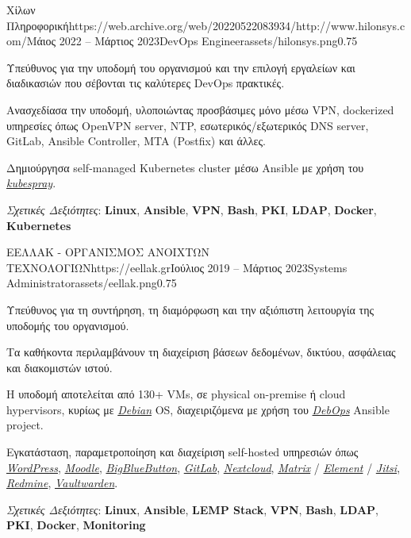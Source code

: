 \documentclass{mycv}
\begin{document}
	\begin{EntryDatedLogo}{Χίλων Πληροφορική}{https://web.archive.org/web/20220522083934/http://www.hilonsys.com/}{Μάιος 2022 -- Μάρτιος 2023}{DevOps Engineer}{assets/hilonsys.png}{0.75}
		\begin{Itemize}
			\item Υπεύθυνος για την υποδομή του οργανισμού και την επιλογή εργαλείων και διαδικασιών που σέβονται τις καλύτερες DevOps πρακτικές.
			\item Ανασχεδίασα την υποδομή, υλοποιώντας προσβάσιμες μόνο μέσω VPN, dockerized υπηρεσίες όπως OpenVPN server, NTP, εσωτερικός/εξωτερικός DNS server, GitLab, Ansible Controller, MTA (Postfix) και άλλες.
			\item Δημιούργησα self-managed Kubernetes cluster μέσω Ansible με χρήση του \href{https://kubespray.io/}{\textit{kubespray}}.
			\item \textit{Σχετικές Δεξιότητες}: \textbf{Linux}, \textbf{Ansible}, \textbf{VPN}, \textbf{Bash}, \textbf{PKI}, \textbf{LDAP}, \textbf{Docker}, \textbf{Kubernetes}
		\end{Itemize}
	\end{EntryDatedLogo}

	\vspace{0.5cm}

	\begin{EntryDatedLogo}{ΕΕΛΛΑΚ - ΟΡΓΑΝΙΣΜΟΣ ΑΝΟΙΧΤΩΝ ΤΕΧΝΟΛΟΓΙΩΝ}{https://eellak.gr}{Ιούλιος 2019 -- Μάρτιος 2023}{Systems Administrator}{assets/eellak.png}{0.75}
		\begin{Itemize}
			\item Υπεύθυνος για τη συντήρηση, τη διαμόρφωση και την αξιόπιστη λειτουργία της υποδομής του οργανισμού.
			\item Τα καθήκοντα περιλαμβάνουν τη διαχείριση βάσεων δεδομένων, δικτύου, ασφάλειας και διακομιστών ιστού.
			\item Η υποδομή αποτελείται από 130+ VMs, σε physical on-premise ή cloud hypervisors, κυρίως με \href{https://www.debian.org}{\textit{Debian}} OS, διαχειριζόμενα με χρήση του \href{https://debops.org}{\textit{DebOps}} Ansible project.
			\item Εγκατάσταση, παραμετροποίηση και διαχείριση self-hosted υπηρεσιών όπως \href{https://wordpress.com}{\textit{WordPress}}, \href{https://moodle.org}{\textit{Moodle}}, \href{https://bigbluebutton.org}{\textit{BigBlueButton}}, \href{https://about.gitlab.com/install/}{\textit{GitLab}}, \href{https://nextcloud.com}{\textit{Nextcloud}}, \href{https://matrix.org}{\textit{Matrix}} / \href{https://element.io}{\textit{Element}} / \href{https://jitsi.org}{\textit{Jitsi}}, \href{https://www.redmine.org/}{\textit{Redmine}}, \href{https://vaultwarden.discourse.group/}{\textit{Vaultwarden}}.
			\item \textit{Σχετικές Δεξιότητες}: \textbf{Linux}, \textbf{Ansible}, \textbf{LEMP Stack}, \textbf{VPN}, \textbf{Bash}, \textbf{LDAP}, \textbf{PKI}, \textbf{Docker}, \textbf{Monitoring}
		\end{Itemize}
	\end{EntryDatedLogo}
\end{document}
